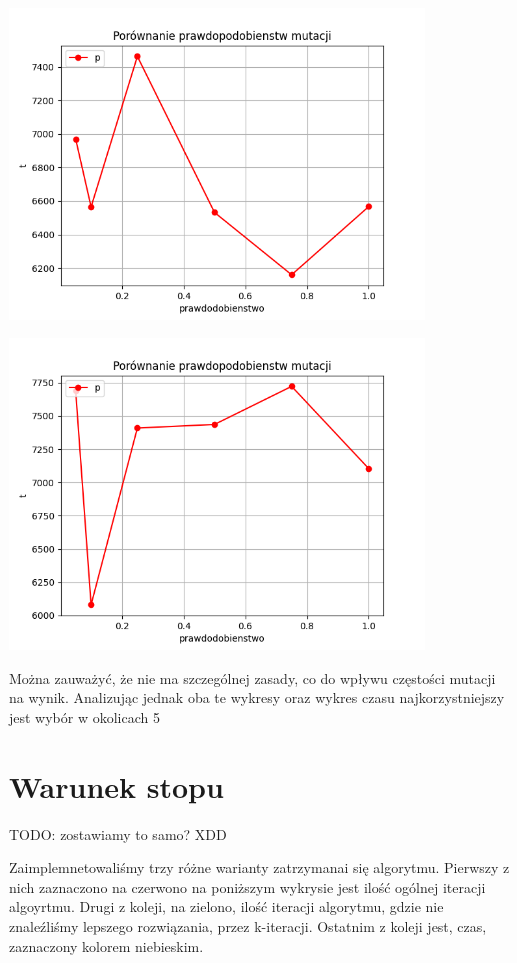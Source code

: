 \documentclass{article}
\begin{document}
     \includegraphics[width=11cm]{./spr3img/Figure_6.png}

     \includegraphics[width=11cm]{./spr3img/Figure_62.png}

     Można zauważyć, że nie ma szczególnej zasady, co do wpływu częstości
     mutacji na wynik. Analizując jednak oba te wykresy oraz wykres czasu
     najkorzystniejszy jest wybór w okolicach 5%

    \section{Warunek stopu}

    TODO: zostawiamy to samo? XDD

    Zaimplemnetowaliśmy trzy różne warianty zatrzymanai się algorytmu.
    Pierwszy z nich zaznaczono na czerwono na poniższym wykrysie jest ilość ogólnej
    iteracji algoyrtmu. Drugi z koleji, na zielono, ilość iteracji algorytmu, gdzie
    nie znaleźliśmy lepszego rozwiązania, przez k-iteracji. Ostatnim z koleji jest, czas,
    zaznaczony kolorem niebieskim.
\end{document}

